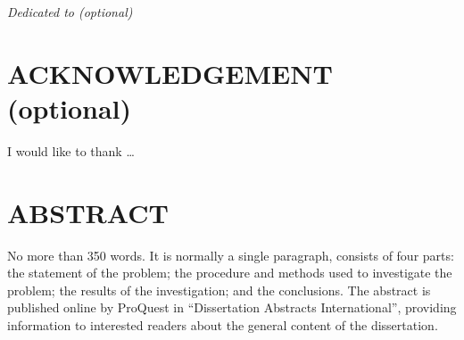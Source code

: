 \documentclass[11pt]{report} %
\begin{document}
\newenvironment{preliminary}{}{}
\titleformat{\chapter}[hang]{\large\center}{\thechapter}{0 pt}{}
\titlespacing*{\chapter}{0pt}{-33 pt}{6 pt} %
\begin{preliminary}


\begin{center}
\textit{Dedicated to (optional)}
\end{center}


\clearpage
\chapter*{ACKNOWLEDGEMENT (optional)}

I would like to thank \ldots



\clearpage
\chapter*{ABSTRACT}
\begin{center}
\mytitle

\myauthor

\mysupervisorname

\end{center}

No more than 350 words. It is normally a single paragraph, consists of four parts: the statement of the problem; the procedure and methods used to investigate the problem; the results of the investigation; and the conclusions. The abstract is published online by ProQuest in ``Dissertation Abstracts International'', providing information to interested readers about the general content of the dissertation.



\end{preliminary}
\end{document}
